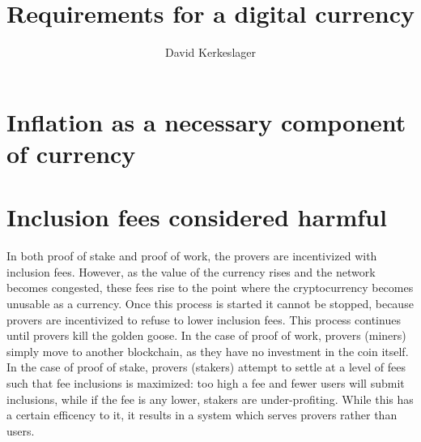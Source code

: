 \documentclass[12pt,letterpaper]{article}
\title{Requirements for a digital currency}
\author{David Kerkeslager}
\date{}
\begin{document}
\begin{titlepage}
\maketitle
\end{titlepage}

\section{Inflation as a necessary component of currency}

\section{Inclusion fees considered harmful}
In both proof of stake and proof of work, the provers are incentivized
with inclusion fees. However, as the value of the currency rises and the
network becomes congested, these fees rise to the point where the
cryptocurrency becomes unusable as a currency. Once this process is started
it cannot be stopped, because provers are incentivized to refuse to lower
inclusion fees. This process continues until provers kill the golden goose.
In the case of proof of work, provers (miners) simply move to another
blockchain, as they have no investment in the coin itself. In the case of proof
of stake, provers (stakers) attempt to settle at a level of fees such that fee
\times inclusions is maximized: too high a fee and fewer users will submit
inclusions, while if the fee is any lower, stakers are under-profiting. While
this has a certain efficency to it, it results in a system which serves provers
rather than users.
\end{document}
